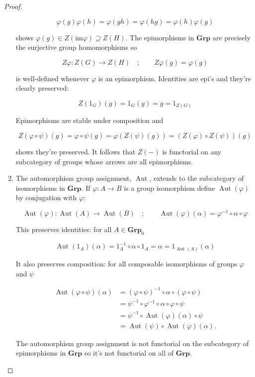 \documentclass[11pt]{amsart}
\theoremstyle{plain}
\theoremstyle{definition}
\DeclareMathOperator{\Aut}{Aut}
\newcommand{\im}{\text{im}}
\newcommand{\Grp}{\mathbf{Grp}}
\newcommand{\noi}{{\noindent}}
\begin{document}
\begin{proof}
\begin{enumerate}[label=(\alph*)]
\[ \varphi(g) \varphi(h) = \varphi(gh) = \varphi(hg) = \varphi(h) \varphi(g) \] 

\noi shows $\varphi (g) \in Z( \im \varphi ) \supseteq Z(H)$. The epimorphisms in $\Grp$ are precisely the surjective group homomorphisms so 

\[ Z \varphi : Z(G) \to Z(H) \quad ; \qquad Z \varphi(g) = \varphi(g)\]

\noi is well-defined whenever $\varphi$ is an epimorphism. Identities are epi's and they're clearly preserved:

\[ Z(1_G)(g) = 1_G(g) = g = 1_{Z(G)}\]

\noi Epimorphisms are stable under composition and 

\[ Z(\varphi \circ \psi) (g) = \varphi \circ \psi (g) = \varphi \left( Z(\psi) (g)\right) = \left(Z(\varphi) \circ Z(\psi)\right) (g) \]

\noi shows they're preserved. It follows that $Z(-)$ is functorial on any subcategory of groups whose arrows are all epimorphisms. \bigskip 

\item The automorphism group assignment, $\Aut$, extends to the subcategory of isomorphisms in $\Grp$. If $\varphi : A \to B$ is a group isomorphism define $\Aut(\varphi)$ by conjugation with $\varphi$:

\[ \Aut(\varphi) : \Aut(A) \to \Aut(B) \quad ; \qquad \Aut(\varphi) (\alpha) = \varphi^{-1} \circ \alpha \circ \varphi \]

\noi This preserves identities: for all $A \in \Grp_0$ 

\[ \Aut(1_A) (\alpha) = 1_A^{-1} \circ \alpha \circ 1_A = \alpha = 1_{\Aut(A)}(\alpha )\] 

\noi It also preserves composition: for all composable isomorphisms of groups $\varphi$ and $\psi$

\begin{align*} 
\Aut(\varphi \circ \psi )(\alpha) 
&= (\varphi \circ \psi)^{-1} \circ \alpha \circ (\varphi \circ \psi) \\
&=  \psi^{-1} \circ \varphi^{-1} \circ \alpha \circ \varphi \circ \psi \\
&=   \psi^{-1} \circ \Aut(\varphi) (\alpha) \circ \psi \\
&= \Aut(\psi) \circ \Aut(\varphi) (\alpha).
\end{align*}\medskip 

\noi The automorphism group assignment is not functorial on the subcategory of epimorphisms in $\Grp$ so it's not functorial on all of $\Grp$. 
\end{enumerate}
\end{proof}
\end{document}
